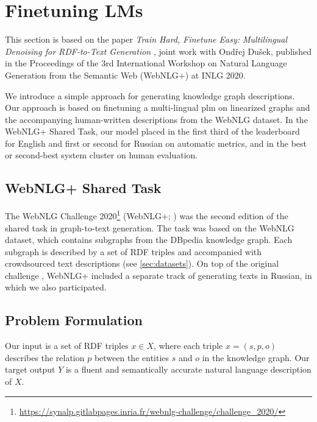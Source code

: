 \section{Finetuning LMs}
\label{sec:finetuning}

\begin{refbox}
    This section is based on the paper \emph{Train Hard, Finetune Easy: Multilingual Denoising for RDF-to-Text Generation} \cite{kasnerTrainHardFinetune2020}, joint work with Ondřej Dušek, published in the Proceedings of the 3rd International Workshop on Natural Language Generation from the Semantic Web (WebNLG+) at INLG 2020.
\end{refbox}


We introduce a simple approach for generating knowledge graph descriptions. Our approach is based on finetuning a multi-lingual \ac{plm} on linearized graphs and the accompanying human-written descriptions from the WebNLG dataset. In the WebNLG+ Shared Task, our model placed in the first third of the leaderboard for English and first or second for Russian on automatic metrics, and in the best or second-best system cluster on human evaluation.

\subsection{WebNLG+ Shared Task}
\label{sec:webnlgp}
The WebNLG Challenge 2020\footnote{\url{https://synalp.gitlabpages.inria.fr/webnlg-challenge/challenge_2020/}} (WebNLG+; \citealp{ferreira20202020}) was the second edition of the shared task in graph-to-text generation. The task was based on the WebNLG dataset, which contains subgraphs from the DBpedia knowledge graph. Each subgraph is described by a set of RDF triples and accompanied with crowdsourced text descriptions (see \autoref{sec:datasets}). On top of the original challenge \cite{gardentWebNLGChallengeGenerating2017}, WebNLG+ included a separate track of generating texts in Russian, in which we also participated.


\subsection{Problem Formulation}
\label{sec:mbart}
Our input is a set of RDF triples $x \in X$, where each triple $x = (s, p, o)$ describes the relation $p$ between the entities $s$ and $o$ in the knowledge graph. Our target output $Y$ is a fluent and semantically accurate natural language description of $X$.


